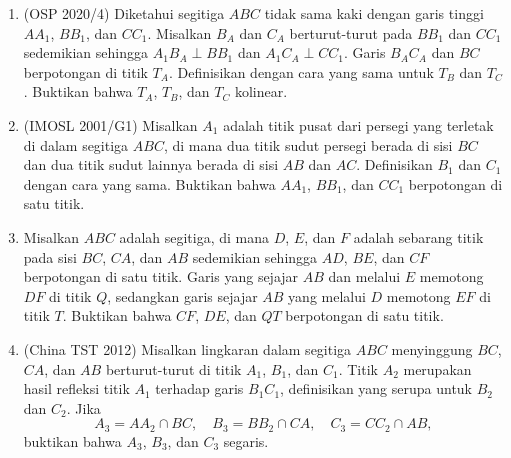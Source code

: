 \documentclass[12pt]{scrartcl}
\begin{document}
\begin{enumerate}
\item (OSP 2020/4) Diketahui segitiga $ABC$ tidak sama kaki dengan garis tinggi $AA_1$, $BB_1$, dan $CC_1$. Misalkan $B_A$ dan $C_A$ berturut-turut pada $BB_1$ dan $CC_1$ sedemikian sehingga $A_1B_A\;\bot\;BB_1$ dan $A_1C_A\;\bot\;CC_1$. Garis $B_AC_A$ dan $BC$ berpotongan di titik $T_A$. Definisikan dengan cara yang sama untuk $T_B$ dan $T_C$. Buktikan bahwa $T_A$, $T_B$, dan $T_C$ kolinear.
\newpage
\item (IMOSL 2001/G1) Misalkan $A_1$ adalah titik pusat dari persegi yang terletak di dalam segitiga $ABC$, di mana dua titik sudut persegi berada di sisi $BC$ dan dua titik sudut lainnya berada di sisi $AB$ dan $AC$. Definisikan $B_1$ dan $C_1$ dengan cara yang sama. Buktikan bahwa $AA_1$, $BB_1$, dan $CC_1$ berpotongan di satu titik.
\item Misalkan $ABC$ adalah segitiga, di mana $D$, $E$, dan $F$ adalah sebarang titik pada sisi $BC$, $CA$, dan $AB$ sedemikian sehingga $AD$, $BE$, dan $CF$ berpotongan di satu titik. Garis yang sejajar $AB$ dan melalui $E$ memotong $DF$ di titik $Q$, sedangkan garis sejajar $AB$ yang melalui $D$ memotong $EF$ di titik $T$. Buktikan bahwa $CF$, $DE$, dan $QT$ berpotongan di satu titik.
\item (China TST 2012) Misalkan lingkaran dalam segitiga $ABC$ menyinggung $BC$, $CA$, dan $AB$ berturut-turut di titik $A_1$, $B_1$, dan $C_1$. Titik $A_2$ merupakan hasil refleksi titik $A_1$ terhadap garis $B_1C_1$, definisikan yang serupa untuk $B_2$ dan $C_2$. Jika
\[A_3 = AA_2\cap BC,\quad B_3=BB_2\cap CA,\quad C_3=CC_2\cap AB,\]
buktikan bahwa $A_3$, $B_3$, dan $C_3$ segaris.
\end{enumerate}
\end{document}
